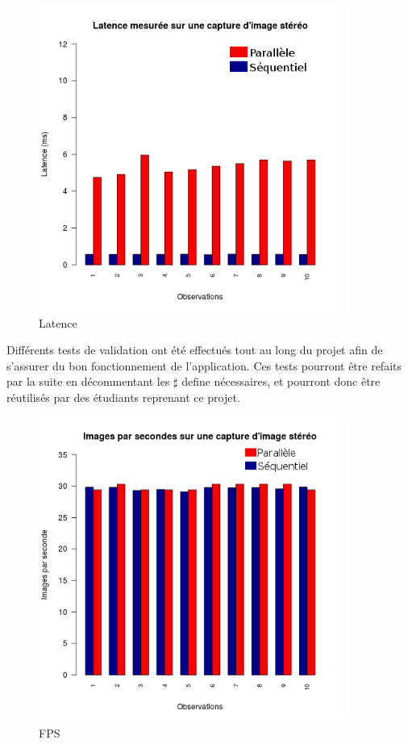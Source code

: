 \begin{figure}[!h]
\centering
\includegraphics[width=\textwidth, height=10cm]{Modules/Picture/latence.png}
\caption{Latence}
\label{latence}
\end{figure}

Différents tests de validation ont été effectués tout au long du projet afin de s'assurer du bon fonctionnement de l'application. Ces tests pourront être refaits par la suite en décommentant les $\sharp$ define nécessaires, et pourront donc être réutilisés par des étudiants reprenant ce projet.

\begin{figure}[!h]
\centering
\includegraphics[width=\textwidth, height=10cm]{Modules/Picture/fps.png}
\caption{FPS}
\label{fps}
\end{figure}

